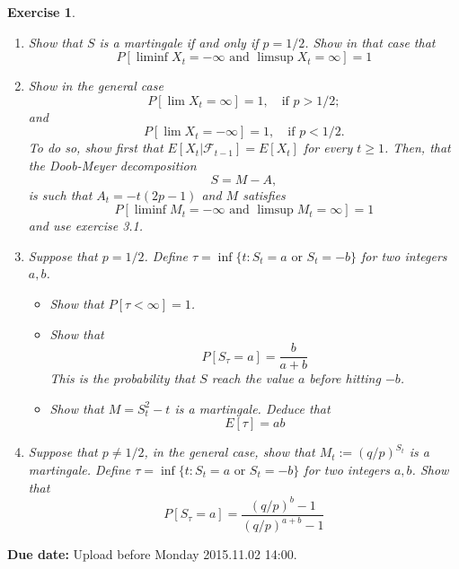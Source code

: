 \documentclass[DIV=classic,a4paper,10pt]{scrartcl}
\newtheorem{exercise}[theorem]{Exercise}
\theoremstyle{nonumberplain}
\newtheorem{proof}{Proof}
\numberwithin{equation}{section}
\begin{document}
\begin{exercise}
\begin{enumerate}[label=\textit{(\roman*)}]
    \item Show that $S$ is a martingale if and only if $p=1/2$. 
        Show in that case that
        \begin{equation*}
            P\left[ \liminf X_t=-\infty\text{ and } \limsup X_t =\infty\right]=1
        \end{equation*}
    \item Show in the general case
        \begin{equation*}
            P\left[ \lim X_t=\infty \right]=1,\quad \text{if } p>1/2;
        \end{equation*}
        and
        \begin{equation*}
            P\left[ \lim X_t =-\infty \right]=1,\quad \text{if }p<1/2.
        \end{equation*}
        To do so, show first that $E[X_t|\mathcal{F}_{t-1}]=E[X_t]$ for every $t\geq 1$.
        Then, that the Doob-Meyer decomposition
        \begin{equation*}
            S=M-A,
        \end{equation*}
        is such that $A_t=-t(2p-1)$ and $M$ satisfies
        \begin{equation*}
            P\left[ \liminf M_t=-\infty\text{ and }\limsup M_t=\infty \right]=1
        \end{equation*}
        and use exercise 3.1.
    \item Suppose that $p=1/2$.
        Define $\tau =\inf\{t\colon S_t=a\text{ or }S_t=-b\}$ for two integers $a,b$.
        \begin{itemize}
            \item Show that $P[\tau<\infty]=1$.
            \item Show that
                \begin{equation*}
                    P\left[ S_{\tau}=a \right]=\frac{b}{a+b}
                \end{equation*}
                This is the probability that $S$ reach the value $a$ before hitting $-b$.
            \item Show that $M=S^2_t-t$ is a martingale.
                Deduce that
                \begin{equation*}
                    E\left[ \tau \right]=ab
                \end{equation*}
        \end{itemize}
    \item Suppose that $p\neq 1/2$, in the general case, show that $M_t:=(q/p)^{S_t}$ is a martingale.
        Define $\tau =\inf\{t\colon S_t=a\text{ or }S_t=-b\}$ for two integers $a,b$.
        Show that
        \begin{equation*}
            P[S_{\tau}=a]=\frac{(q/p)^b-1}{(q/p)^{a+b}-1}
        \end{equation*}
\end{enumerate}
\end{exercise}
    


\smallskip
\noindent
\textbf{Due date:} Upload before Monday 2015.11.02 14:00.
\end{document}
